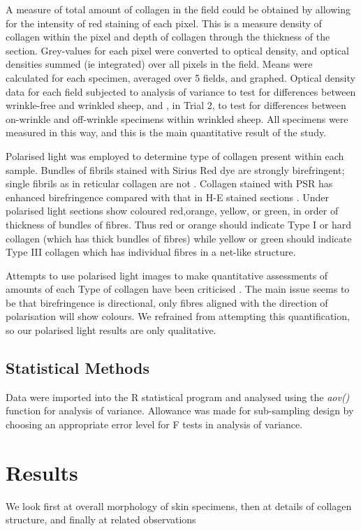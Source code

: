 \documentclass[]{interact}
\theoremstyle{plain}%
\theoremstyle{definition}
\theoremstyle{remark}
\begin{document}
A measure of total amount of collagen in the field could be obtained by allowing for the intensity of red staining of each pixel. This  is a measure density of collagen within the pixel and depth of collagen through the thickness of the section.  Grey-values for each pixel were converted to optical density, and optical densities summed (ie integrated) over all pixels in the field.
Means were calculated for each specimen, averaged over 5 fields, and graphed.  Optical density data for each field subjected to analysis of variance to test for differences between wrinkle-free and wrinkled sheep, and , in Trial 2, to test for differences between on-wrinkle and off-wrinkle specimens within wrinkled sheep.
All specimens were measured in this way, and this is the main quantitative result of the study.

Polarised light was employed to determine type of collagen present within each sample. Bundles of fibrils stained with Sirius Red dye are strongly birefringent; single fibrils as in reticular collagen are not \citep{cuttle-2005}.
Collagen stained with PSR has enhanced birefringence compared with that in H-E stained sections \citep{junqueira-1979}. Under polarised light sections show coloured red,orange, yellow, or green, in order of thickness of bundles of fibres. Thus red or orange should indicate Type I or hard collagen (which has thick bundles of fibres) while yellow or green should indicate Type III collagen which has individual fibres in a net-like structure.

Attempts to use polarised light images to make quantitative assessments of amounts of each Type of collagen have been criticised \citep{lattouf-2014}.  The main issue seems to be that birefringence is directional, only fibres aligned with the direction of polarisation will show colours. We refrained from attempting this quantification, so our polarised light results are only qualitative.


\subsection{Statistical Methods}

Data were imported into the R statistical program \citep{rcoreteam-2017} and analysed using the {\em aov()} function for analysis of variance.
Allowance was made for sub-sampling design by choosing  an appropriate error level for F tests in analysis of variance. 

\section{Results}
We look first at overall morphology of skin specimens, then at details of collagen structure, and finally at related observations
\end{document}

